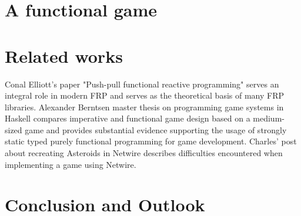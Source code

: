 \documentclass[pdftex,a4paper]{extarticle}
\begin{document}
\section{A functional game}
\label{sec:game}

\section{Related works}
\label{sec:related}
Conal Elliott's paper "Push-pull functional reactive programming" \cite{Elliott2009-push-pull-frp} serves an integral role in modern FRP
and serves as the theoretical basis of many FRP libraries. Alexander Berntsen master thesis on programming game systems in Haskell \cite{Berntsen2014-game-systems-haskell} compares imperative and functional game design based on a medium-sized game and provides substantial evidence supporting the usage of strongly static typed purely functional programming for game development. Charles' post about recreating Asteroids in Netwire \cite{asteroids} describes difficulties encountered when implementing a game using Netwire.
\section{Conclusion and Outlook}
\label{sec:conclusion}



\end{document}
